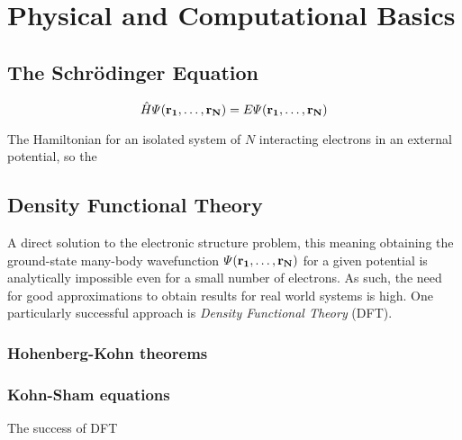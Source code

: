 \documentclass[\main/main.tex]{subfiles}
\begin{document}
\chapter{Physical and Computational Basics\label{chap:theory}}

\section{The Schrödinger Equation\label{sec:theory_schrödinger}}

\begin{equation}
    \hat{H} \Psi (\vb{r_1}, \ldots, \vb{r_N}) = E \Psi (\vb{r_1}, \ldots, \vb{r_N})
\end{equation}

The Hamiltonian for an isolated system of \(N\) interacting electrons in an external potential, so the 

\section{Density Functional Theory\label{sec:theory_dft}}

A direct solution to the electronic structure problem, this meaning obtaining the ground-state many-body wavefunction \(\Psi (\vb{r_1}, \ldots, \vb{r_N})\) for
a given potential is analytically impossible even for a small number of electrons. As such, the need for good approximations to obtain results for real world
systems is high. One particularly successful approach is \emph{Density Functional Theory} (DFT).


\subsection{Hohenberg-Kohn theorems}

\subsection{Kohn-Sham equations}

The success of DFT
\end{document}
